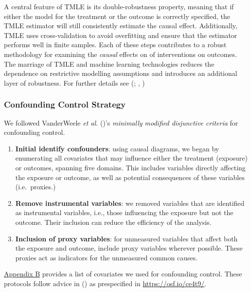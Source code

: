 \documentclass[
  singlecolumn]{article}
\begin{document}
A central feature of TMLE is its double-robustness property, meaning
that if either the model for the treatment or the outcome is correctly
specified, the TMLE estimator will still consistently estimate the
causal effect. Additionally, TMLE uses cross-validation to avoid
overfitting and ensure that the estimator performs well in finite
samples. Each of these steps contributes to a robust methodology for
examining the \emph{causal} effects on of interventions on outcomes. The
marriage of TMLE and machine learning technologies reduces the
dependence on restrictive modelling assumptions and introduces an
additional layer of robustness. For further details see
(;
,
)

\subsubsection{Confounding Control
Strategy}\label{confounding-control-strategy}

We followed VanderWeele \emph{et al.}
()'s \emph{minimally modified
disjunctive criteria} for confounding control.

\begin{enumerate}
\def\labelenumi{\arabic{enumi}.}
\item
  \textbf{Initial identify confounders}: using causal diagrams, we began
  by enumerating all covariates that may influence either the treatment
  (exposure) or outcomes, spanning five domains. This includes variables
  directly affecting the exposure or outcome, as well as potential
  consequences of these variables (i.e.~proxies.)
\item
  \textbf{Remove instrumental variables}: we removed variables that are
  identified as instrumental variables, i.e., those influencing the
  exposure but not the outcome. Their inclusion can reduce the
  efficiency of the analysis.
\item
  \textbf{Inclusion of proxy variables}: for unmeasured variables that
  affect both the exposure and outcome, include proxy variables wherever
  possible. These proxies act as indicators for the unmeasured common
  causes.
\end{enumerate}

\hyperref[appendix-demographics]{Appendix B} provides a list of
covariates we used for confounding control. These protocols follow
advice in () as
prespecified in \url{https://osf.io/ce4t9/}.
\end{document}
